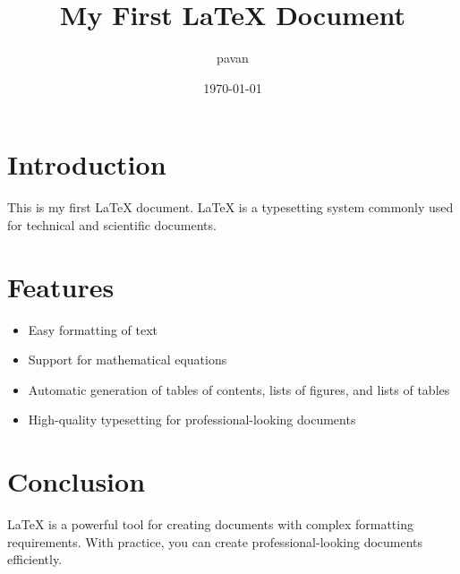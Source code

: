 \documentclass{article} %
\title{My First LaTeX Document}
\author{pavan}
\date{\today}
\begin{document}
	\maketitle
	\section{Introduction}
	This is my first LaTeX document. LaTeX is a typesetting system commonly
	used for technical and scientific documents.
	\section{Features}
	\begin{itemize}
		\item Easy formatting of text
		\item Support for mathematical equations
		\item Automatic generation of tables of contents, lists of figures, and lists of
		tables
		\item High-quality typesetting for professional-looking documents
	\end{itemize}
	\section{Conclusion}
	LaTeX is a powerful tool for creating documents with complex formatting
	requirements. With practice, you can create professional-looking documents
	efficiently.
\end{document}
